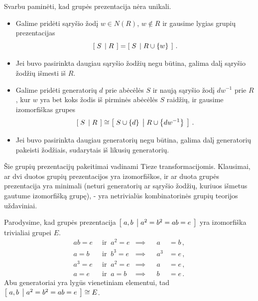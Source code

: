 \begin{remark}
	Svarbu paminėti, kad grupės prezentacija nėra unikali.
	\begin{itemize}
		\item Galime pridėti sąryšio žodį $w \in N(R)$, $w \notin R$
			ir gausime lygias grupių prezentacijas
			\begin{equation}
				\left[\; S \;\left|\; R \;\right.\right] = \left[\; S \;\left|\; R \cup \qty{w} \;\right.\right]
				\,.
			\end{equation}
		\item Jei buvo pasirinkta daugiau sąryšio žodžių negu būtina,
			galima dalį sąryšio žodžių išmesti iš $R$.
		\item Galime pridėti generatorių $d$ prie abėcėlės $S$
			ir naują sąryšio žodį $dw^{-1}$ prie $R$,
			kur $w$ yra bet koks žodis iš pirminės abėcėlės $S$ raidžių,
			ir gausime izomorfiškas grupes
			\begin{equation}
				\left[\; S \;\left|\; R \;\right.\right] \cong \left[\;  S \cup \qty{d}  \;\left|\;  R \cup \qty{dw^{-1}}  \;\right.\right]
				\,.
			\end{equation}
		\item Jei buvo pasirinkta daugiau generatorių negu būtina,
			galima dalį generatorių pakeisti žodžiais,
			sudarytais iš likusių generatorių.
	\end{itemize}
	Šie grupių prezentacijų pakeitimai vadinami Tieze transformacijomis.
	Klausimai, ar dvi duotos grupių prezentacijos yra izomorfiškos,
	ir ar duota grupės prezentacija yra minimali
	(neturi generatorių ar sąryšio žodžių,
	kuriuos išmetus gautume izomorfišką grupę), -
	yra netrivialūs kombinatorinės grupių teorijos uždaviniai.
\end{remark}

\begin{example}
	Parodysime, kad grupės prezentacija $\left[\; a,b \;\left|\; a^2=b^2=ab=e \;\right.\right]$
	yra izomorfiška trivialiai grupei $E$.
	\begin{equation}
		\begin{aligned}
			ab=e	&\;\;\text{ir}\;\; a^2=e	&\implies&& a &= b		\,,\\
			a=b		&\;\;\text{ir}\;\; b^3=e	&\implies&& a^3 &= e	\,,\\
			a^3=e	&\;\;\text{ir}\;\; a^2=e	&\implies&& a &= e		\,,\\
			a=e		&\;\;\text{ir}\;\; a=b		&\implies&& b &= e		\,.
		\end{aligned}
	\end{equation}
	Abu generatoriai yra lygūs vienetiniam elementui,
	tad $ \left[\; a,b \;\left|\; a^2=b^2=ab=e \;\right.\right] \cong E $.
\end{example}


